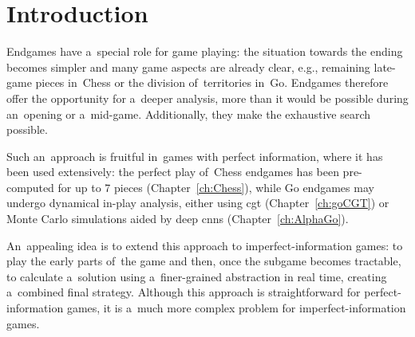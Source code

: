 \chapter*{Introduction}
Endgames have a~special role for game playing:
the situation towards the ending becomes simpler and many game aspects are already clear, e.g., remaining late-game pieces in~Chess or the division of~territories in~Go.
Endgames therefore offer the opportunity for a~deeper analysis, more than it would be possible during an~opening or a~mid-game.
Additionally, they make the exhaustive search possible.

Such an~approach is fruitful in~games with perfect information, where it has been used extensively:
the perfect play of~Chess endgames has been pre-computed for up to 7 pieces (Chapter~\ref{ch:Chess}), while Go endgames may undergo dynamical in-play analysis, either using \acrlong{cgt} (Chapter~\ref{ch:goCGT}) or Monte Carlo simulations aided by deep \acrlong{cnn}s (Chapter~\ref{ch:AlphaGo}).

An~appealing idea is to extend this approach to imperfect-information games:
to play the early parts of~the game and then, once the subgame becomes tractable, to calculate a~solution using a~finer-grained abstraction in real time, creating a~combined final strategy.
Although this approach is straightforward for perfect-information games, it is a~much more complex problem for imperfect-information games. 

